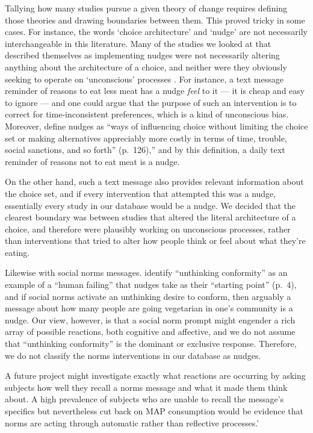 \documentclass[sn-nature,referee,pdflatex]{sn-jnl}
\begin{document}
Tallying how many studies pursue a given theory of change requires
defining those theories and drawing boundaries between them. This proved
tricky in some cases. For instance, the words `choice architecture' and
`nudge' \citep{thaler2009} are not necessarily interchangeable in this
literature. Many of the studies we looked at that described themselves
as implementing nudges were not necessarily altering anything about the
architecture of a choice, and neither were they obviously seeking to
operate on `unconscious' processes \citep{garnett2020}. For instance, a
text message reminder of reasons to eat less meat has a nudge
\emph{feel} to it --- it is cheap and easy to ignore --- and one could
argue that the purpose of such an intervention is to correct for
time-inconsistent preferences, which is a kind of unconscious bias.
Moreover, \citep{hausman2010} define nudges as ``ways of influencing
choice without limiting the choice set or making alternatives
appreciably more costly in terms of time, trouble, social sanctions, and
so forth'' (p.~126),'' and by this definition, a daily text reminder of
reasons not to eat meat is a nudge.

On the other hand, such a text message also provides relevant
information about the choice set, and if every intervention that
attempted this was a nudge, essentially every study in our database
would be a nudge. We decided that the clearest boundary was between
studies that altered the literal architecture of a choice, and therefore
were plausibly working on unconscious processes, rather than
interventions that tried to alter how people think or feel about what
they're eating.

Likewise with social norms messages. \citep{mols2015} identify
``unthinking conformity'' as an example of a ``human failing'' that
nudges take as their ``starting point'' (p.~4), and if social norms
activate an unthinking desire to conform, then arguably a message about
how many people are going vegetarian in one's community is a nudge. Our
view, however, is that a social norm prompt might engender a rich array
of possible reactions, both cognitive and affective, and we do not
assume that ``unthinking conformity'' is the dominant or exclusive
response. Therefore, we do not classify the norms interventions in our
database as nudges.

A future project might investigate exactly what reactions are occurring
by asking subjects how well they recall a norms message and what it made
them think about. A high prevalence of subjects who are unable to recall
the message's specifics but nevertheless cut back on MAP consumption
would be evidence that norms are acting through automatic rather than
reflective processes.'
\end{document}

